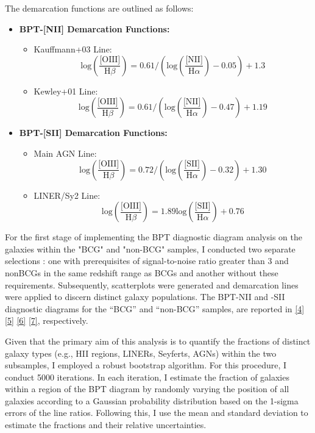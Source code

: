 The demarcation functions are outlined as follows:
\begin{itemize}
    \item \textbf{BPT-[NII] Demarcation Functions:}
    \begin{itemize}
        \item Kauffmann+03 Line: \[ \text{log}(\frac{\text{[OIII]}}{\text{H}\beta}) = 0.61 / (\text{log}(\frac{\text{[NII]}}{\text{H}\alpha}) - 0.05) + 1.3 \]
        \item Kewley+01 Line: \[ \text{log}(\frac{\text{[OIII]}}{\text{H}\beta}) = 0.61 / (\text{log}(\frac{\text{[NII]}}{\text{H}\alpha}) - 0.47) + 1.19 \]
    \end{itemize}

    \item \textbf{BPT-[SII] Demarcation Functions:}
    \begin{itemize}
        \item Main AGN Line: \[ \text{log}(\frac{\text{[OIII]}}{\text{H}\beta}) = 0.72 / (\text{log}(\frac{\text{[SII]}}{\text{H}\alpha}) - 0.32) + 1.30 \]
        \item LINER/Sy2 Line: \[ \text{log}(\frac{\text{[OIII]}}{\text{H}\beta}) = 1.89 \text{log}(\frac{\text{[SII]}}{\text{H}\alpha}) + 0.76 \]
    \end{itemize}
\end{itemize}


For the first stage of implementing the BPT diagnostic diagram analysis on the galaxies within the "BCG" and "non-BCG" samples, I conducted two separate selections : one with prerequisites of signal-to-noise ratio greater than 3 and nonBCGs in the same redshift range as BCGs and another without these requirements. Subsequently, scatterplots were generated and demarcation lines were applied to discern distinct galaxy populations.
The BPT-NII and -SII diagnostic diagrams for the “BCG” and “non-BCG” samples, are reported in \autoref{4} \autoref{5} \autoref{6} \autoref{7}, respectively.

Given that the primary aim of this analysis is to quantify the fractions of distinct galaxy types (e.g., HII regions, LINERs, Seyferts, AGNs) within the two subsamples, I employed a robust bootstrap algorithm. For this procedure, I conduct 5000 iterations. In each iteration, I estimate the fraction of galaxies within a region of the BPT diagram by randomly varying the position of all galaxies according to a Gaussian probability distribution based on the 1-sigma errors of the line ratios. Following this, I use the mean and standard deviation to estimate the fractions and their relative uncertainties.



